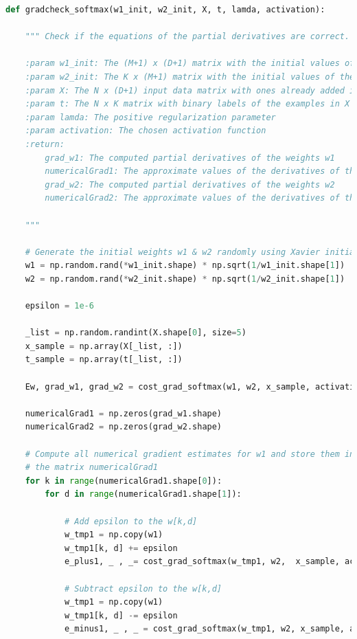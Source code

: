 \documentclass[11pt]{article}
\begin{document}
\begin{lstlisting}[language = Python]
def gradcheck_softmax(w1_init, w2_init, X, t, lamda, activation):
    
    """ Check if the equations of the partial derivatives are correct.
    
    :param w1_init: The (M+1) x (D+1) matrix with the initial values of the parameters w1
    :param w2_init: The K x (M+1) matrix with the initial values of the parameters w2
    :param X: The N x (D+1) input data matrix with ones already added in the first column
    :param t: The N x K matrix with binary labels of the examples in X indicating the 10 categories
    :param lamda: The positive regularization parameter
    :param activation: The chosen activation function
    :return:
        grad_w1: The computed partial derivatives of the weights w1
        numericalGrad1: The approximate values of the derivatives of the weights w1
        grad_w2: The computed partial derivatives of the weights w2
        numericalGrad2: The approximate values of the derivatives of the weights w2
        
    """
    
    # Generate the initial weights w1 & w2 randomly using Xavier initialization method
    w1 = np.random.rand(*w1_init.shape) * np.sqrt(1/w1_init.shape[1])
    w2 = np.random.rand(*w2_init.shape) * np.sqrt(1/w2_init.shape[1])
    
    epsilon = 1e-6

    _list = np.random.randint(X.shape[0], size=5)
    x_sample = np.array(X[_list, :])
    t_sample = np.array(t[_list, :])
    
    Ew, grad_w1, grad_w2 = cost_grad_softmax(w1, w2, x_sample, activation, t_sample, lamda)
    
    numericalGrad1 = np.zeros(grad_w1.shape)
    numericalGrad2 = np.zeros(grad_w2.shape)
    
    # Compute all numerical gradient estimates for w1 and store them in
    # the matrix numericalGrad1
    for k in range(numericalGrad1.shape[0]):
        for d in range(numericalGrad1.shape[1]):
            
            # Add epsilon to the w[k,d]
            w_tmp1 = np.copy(w1)
            w_tmp1[k, d] += epsilon
            e_plus1, _ , _= cost_grad_softmax(w_tmp1, w2,  x_sample, activation, t_sample, lamda)
            
            # Subtract epsilon to the w[k,d]
            w_tmp1 = np.copy(w1)
            w_tmp1[k, d] -= epsilon
            e_minus1, _ , _ = cost_grad_softmax(w_tmp1, w2, x_sample, activation, t_sample, lamda)
            

\end{lstlisting}
\end{document}
